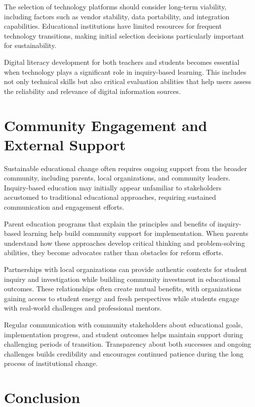 \documentclass[
  Letterpaper,
]{scrbook}
\begin{document}
The selection of technology platforms should consider long-term
viability, including factors such as vendor stability, data portability,
and integration capabilities. Educational institutions have limited
resources for frequent technology transitions, making initial selection
decisions particularly important for sustainability.

Digital literacy development for both teachers and students becomes
essential when technology plays a significant role in inquiry-based
learning. This includes not only technical skills but also critical
evaluation abilities that help users assess the reliability and
relevance of digital information sources.

\section{Community Engagement and External
Support}\label{community-engagement-and-external-support}

Sustainable educational change often requires ongoing support from the
broader community, including parents, local organizations, and community
leaders. Inquiry-based education may initially appear unfamiliar to
stakeholders accustomed to traditional educational approaches, requiring
sustained communication and engagement efforts.

Parent education programs that explain the principles and benefits of
inquiry-based learning help build community support for implementation.
When parents understand how these approaches develop critical thinking
and problem-solving abilities, they become advocates rather than
obstacles for reform efforts.

Partnerships with local organizations can provide authentic contexts for
student inquiry and investigation while building community investment in
educational outcomes. These relationships often create mutual benefits,
with organizations gaining access to student energy and fresh
perspectives while students engage with real-world challenges and
professional mentors.

Regular communication with community stakeholders about educational
goals, implementation progress, and student outcomes helps maintain
support during challenging periods of transition. Transparency about
both successes and ongoing challenges builds credibility and encourages
continued patience during the long process of institutional change.

\section{Conclusion}\label{conclusion-6}
\end{document}
